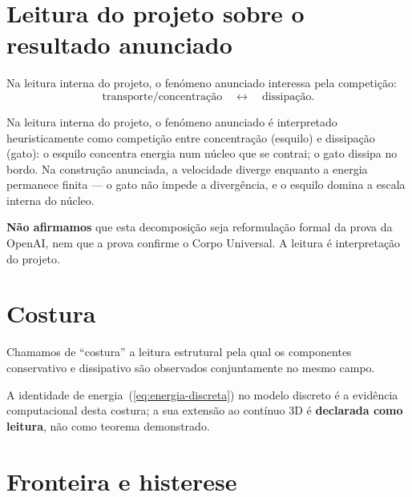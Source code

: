 \documentclass[11pt,a4paper]{article}
\begin{document}
\section{Leitura do projeto sobre o resultado anunciado}
\label{sec:leitura-openai}

Na leitura interna do projeto, o fenómeno anunciado
interessa pela competição:
\[
\text{transporte/concentração}
\quad\leftrightarrow\quad
\text{dissipação}.
\]

Na leitura interna do projeto, o fenómeno anunciado é
interpretado heuristicamente como competição entre
concentração (esquilo) e dissipação (gato): o esquilo
concentra energia num núcleo que se contrai; o gato
dissipa no bordo. Na construção anunciada, a velocidade
diverge enquanto a energia permanece finita --- o gato
não impede a divergência, e o esquilo domina a escala
interna do núcleo.

\textbf{Não afirmamos} que esta decomposição seja
reformulação formal da prova da OpenAI, nem que a prova
confirme o Corpo Universal. A leitura é interpretação
do projeto.

\section{Costura}\label{sec:costura}

Chamamos de ``costura'' a leitura estrutural pela qual os
componentes conservativo e dissipativo são observados
conjunta\-mente no mesmo campo.


A identidade de energia~(\ref{eq:energia-discreta}) no
modelo discreto é a evidência computacional desta costura;
a sua extensão ao contínuo 3D é \textbf{declarada como
leitura}, não como teorema demonstrado.

\section{Fronteira e histerese}\label{sec:fronteira}
\end{document}
